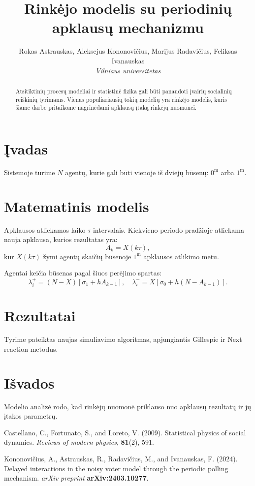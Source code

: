 \documentclass[a4paper,12pt]{article}
\begin{document}
\title{\textbf{Rinkėjo modelis su periodinių apklausų mechanizmu}}
\author{%
    Rokas Astrauskas, Aleksejus Kononovičius, Marijus Radavičius, Feliksas Ivanauskas \\
    \textit{Vilniaus universitetas}
}
\date{} %
\maketitle

\begin{abstract}
Atsitiktinių procesų modeliai ir statistinė fizika gali būti panaudoti įvairių socialinių reiškinių tyrimams. Vienas populiariausių tokių modelių yra rinkėjo modelis, kuris šiame darbe pritaikome nagrinėdami apklausų įtaką rinkėjų nuomonei.
\end{abstract}

\section{Įvadas}
Sistemoje turime \(N\) agentų, kurie gali būti vienoje iš dviejų būsenų: \(0^\text{m}\) arba \(1^\text{m}\). 

\section{Matematinis modelis}
Apklausos atliekamos laiko \( \tau \) intervalais. Kiekvieno periodo pradžioje atliekama nauja apklausa, kurios rezultatas yra:
\[
A_k = X(k\tau),
\]
kur \( X(k\tau) \) žymi agentų skaičių būsenoje \(1^\text{m}\) apklausos atlikimo metu.

Agentai keičia būsenas pagal šiuos perėjimo spartas:
\[
\lambda_i^+ = (N - X) \left[\sigma_1 + h A_{k-1} \right], \quad
\lambda_i^- = X \left[\sigma_0 + h (N - A_{k-1}) \right].
\]

\section{Rezultatai}
Tyrime pateiktas naujas simuliavimo algoritmas, apjungiantis Gillespie ir Next reaction metodus.

\section{Išvados}
Modelio analizė rodo, kad rinkėjų nuomonė priklauso nuo apklausų rezultatų ir jų įtakos parametrų.

\begin{thebibliography}{9}
Castellano, C., Fortunato, S., and Loreto, V. (2009). Statistical physics of social dynamics. \textit{Reviews of modern physics}, \textbf{81}(2), 591.

Kononovičius, A., Astrauskas, R., Radavičius, M., and Ivanauskas, F. (2024). Delayed interactions in the noisy voter model through the periodic polling mechanism. \textit{arXiv preprint} \textbf{arXiv:2403.10277}.
\end{thebibliography}
\end{document}
